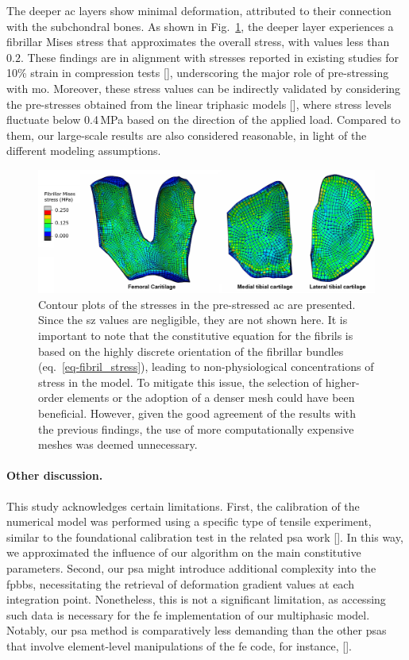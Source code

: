The deeper \ac{ac} layers show minimal deformation, attributed to their connection with the subchondral bones. As shown in Fig.~\ref{fig:components}, the deeper layer experiences a fibrillar Mises stress that approximates the overall stress, with values less than $0.2$. These findings are in alignment with stresses reported in existing studies for 10\% strain in compression tests [\cite{sajjadinia2019}], underscoring the major role of pre-stressing with \ac{mo}. Moreover, these stress values can be indirectly validated by considering the pre-stresses obtained from the linear triphasic models [\cite{lai1991,setton1996}], where stress levels fluctuate below 0.4\,MPa based on the direction of the applied load. Compared to them, our large-scale results are also considered reasonable, in light of the different modeling assumptions.
%
\begin{figure}[H]\centering
\includegraphics[width=\textwidth]{img/components.jpg}
\caption{Contour plots of the stresses in the pre-stressed \ac{ac} are presented. Since the \ac{sz} values are negligible, they are not shown here. It is important to note that the constitutive equation for the fibrils is based on the highly discrete orientation of the fibrillar bundles (eq.~\ref{eq-fibril_stress}), leading to non-physiological concentrations of stress in the model. To mitigate this issue, the selection of higher-order elements or the adoption of a denser mesh could have been beneficial. However, given the good agreement of the results with the previous findings, the use of more computationally expensive meshes was deemed unnecessary.}
\label{fig:components}
\end{figure}

\paragraph{Other discussion.} This study acknowledges certain limitations. First, the calibration of the numerical model was performed using a specific type of tensile experiment, similar to the foundational calibration test in the related \ac{psa} work [\cite{wang2018}]. In this way, we approximated the influence of our algorithm on the main constitutive parameters. Second, our \ac{psa} might introduce additional complexity into the \ac{fpbbs}, necessitating the retrieval of deformation gradient values at each integration point. Nonetheless, this is not a significant limitation, as accessing such data is necessary for the \ac{fe} implementation of our multiphasic model. Notably, our \ac{psa} method is comparatively less demanding than the other \acp{psa} that involve element-level manipulations of the \ac{fe} code, for instance, [\cite{pierce2015,weisbecker2014}].

